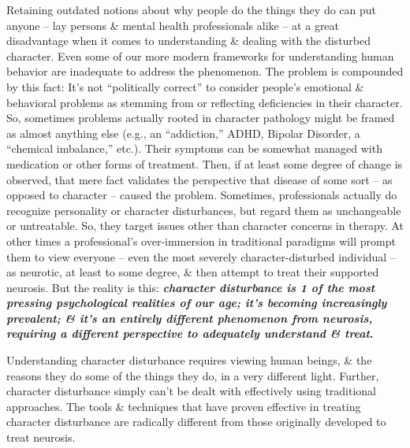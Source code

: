 \documentclass{article}
\numberwithin{equation}{section}
\begin{document}
Retaining outdated notions about why people do the things they do can put anyone -- lay persons \& mental health professionals alike -- at a great disadvantage when it comes to understanding \& dealing with the disturbed character. Even some of our more modern frameworks for understanding human behavior are inadequate to address the phenomenon. The problem is compounded by this fact: It's not ``politically correct'' to consider people's emotional \& behavioral problems as stemming from or reflecting deficiencies in their character. So, sometimes problems actually rooted in character pathology might be framed as almost anything else (e.g., an ``addiction,'' ADHD, Bipolar Disorder, a ``chemical imbalance,'' etc.). Their symptoms can be somewhat managed with medication or other forms of treatment. Then, if at least some degree of change is observed, that mere fact validates the perspective that disease of some sort -- as opposed to character -- caused the problem. Sometimes, professionals actually do recognize personality or character disturbances, but regard them as unchangeable or untreatable. So, they target issues other than character concerns in therapy. At other times a professional's over-immersion in traditional paradigms will prompt them to view everyone -- even the most severely character-disturbed individual -- as neurotic, at least to some degree, \& then attempt to treat their supported neurosis. But the reality is this: \textbf{\textit{character disturbance is 1 of the most pressing psychological realities of our age; it's becoming increasingly prevalent; \& it's an entirely different phenomenon from neurosis, requiring a different perspective to adequately understand \& treat}.}

Understanding character disturbance requires viewing human beings, \& the reasons they do some of the things they do, in a very different light. Further, character disturbance simply can't be dealt with effectively using traditional approaches. The tools \& techniques that have proven effective in treating character disturbance are radically different from those originally developed to treat neurosis.
\end{document}
